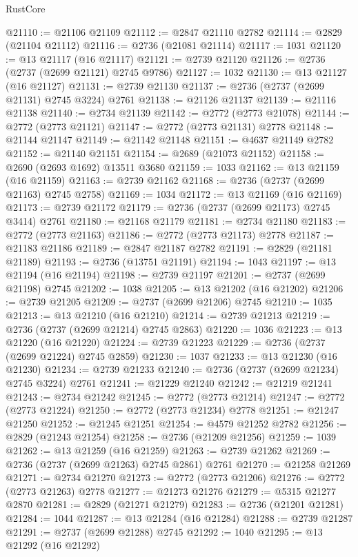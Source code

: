 \begin{lexlean}{RustCore}
\begin{coremodule}
@21110 := @21106 @21109
@21112 := @2847 @21110 @2782
@21114 := @2829 (@21104 @21112)
@21116 := @2736 (@21081 @21114)
@21117 := 1031
@21120 := @13 @21117 (@16 @21117)
@21121 := @2739 @21120
@21126 := @2736 (@2737 (@2699 @21121) @2745 @9786)
@21127 := 1032
@21130 := @13 @21127 (@16 @21127)
@21131 := @2739 @21130
@21137 := @2736 (@2737 (@2699 @21131) @2745 @3224) @2761
@21138 := @21126 @21137
@21139 := @21116 @21138
@21140 := @2734 @21139
@21142 := @2772 (@2773 @21078)
@21144 := @2772 (@2773 @21121)
@21147 := @2772 (@2773 @21131) @2778
@21148 := @21144 @21147
@21149 := @21142 @21148
@21151 := @4637 @21149 @2782
@21152 := @21140 @21151
@21154 := @2689 (@21073 @21152)
@21158 := @2690 (@2693 @1692) @13511 @3680
@21159 := 1033
@21162 := @13 @21159 (@16 @21159)
@21163 := @2739 @21162
@21168 := @2736 (@2737 (@2699 @21163) @2745 @2758)
@21169 := 1034
@21172 := @13 @21169 (@16 @21169)
@21173 := @2739 @21172
@21179 := @2736 (@2737 (@2699 @21173) @2745 @3414) @2761
@21180 := @21168 @21179
@21181 := @2734 @21180
@21183 := @2772 (@2773 @21163)
@21186 := @2772 (@2773 @21173) @2778
@21187 := @21183 @21186
@21189 := @2847 @21187 @2782
@21191 := @2829 (@21181 @21189)
@21193 := @2736 (@13751 @21191)
@21194 := 1043
@21197 := @13 @21194 (@16 @21194)
@21198 := @2739 @21197
@21201 := @2737 (@2699 @21198) @2745
@21202 := 1038
@21205 := @13 @21202 (@16 @21202)
@21206 := @2739 @21205
@21209 := @2737 (@2699 @21206) @2745
@21210 := 1035
@21213 := @13 @21210 (@16 @21210)
@21214 := @2739 @21213
@21219 := @2736 (@2737 (@2699 @21214) @2745 @2863)
@21220 := 1036
@21223 := @13 @21220 (@16 @21220)
@21224 := @2739 @21223
@21229 := @2736 (@2737 (@2699 @21224) @2745 @2859)
@21230 := 1037
@21233 := @13 @21230 (@16 @21230)
@21234 := @2739 @21233
@21240 := @2736 (@2737 (@2699 @21234) @2745 @3224) @2761
@21241 := @21229 @21240
@21242 := @21219 @21241
@21243 := @2734 @21242
@21245 := @2772 (@2773 @21214)
@21247 := @2772 (@2773 @21224)
@21250 := @2772 (@2773 @21234) @2778
@21251 := @21247 @21250
@21252 := @21245 @21251
@21254 := @4579 @21252 @2782
@21256 := @2829 (@21243 @21254)
@21258 := @2736 (@21209 @21256)
@21259 := 1039
@21262 := @13 @21259 (@16 @21259)
@21263 := @2739 @21262
@21269 := @2736 (@2737 (@2699 @21263) @2745 @2861) @2761
@21270 := @21258 @21269
@21271 := @2734 @21270
@21273 := @2772 (@2773 @21206)
@21276 := @2772 (@2773 @21263) @2778
@21277 := @21273 @21276
@21279 := @5315 @21277 @2870
@21281 := @2829 (@21271 @21279)
@21283 := @2736 (@21201 @21281)
@21284 := 1044
@21287 := @13 @21284 (@16 @21284)
@21288 := @2739 @21287
@21291 := @2737 (@2699 @21288) @2745
@21292 := 1040
@21295 := @13 @21292 (@16 @21292)

\end{coremodule}
\end{lexlean}
